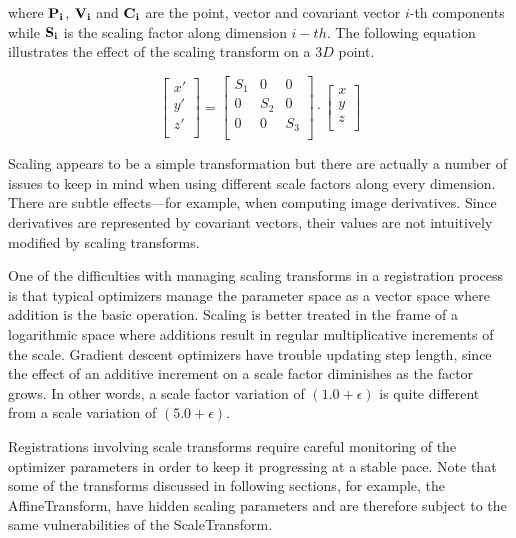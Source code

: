 where $\bf{P}_i$, $\bf{V}_i$ and $\bf{C}_i$ are the point, vector and covariant
vector $i$-th components while $\bf{S}_i$ is the scaling factor along dimension
$i-th$.  The following equation illustrates the effect of the scaling transform
on a $3D$ point.

\begin{equation}
\left[
\begin{array}{c}
x' \\
y' \\
z' \\
\end{array}
\right]
=
\left[
\begin{array}{ccc}
S_1 &  0  &  0  \\
 0  & S_2 &  0  \\
 0  &  0  & S_3 \\
\end{array}
\right]
\cdot
\left[
\begin{array}{c}
x  \\
y  \\
z  \\
\end{array}
\right]
\end{equation}

Scaling appears to be a simple transformation but there are actually a
number of issues to keep in mind when using different scale factors along
every dimension. There are subtle effects---for example, when computing image
derivatives. Since derivatives are represented by covariant vectors, their
values are not intuitively modified by scaling transforms.

One of the difficulties with managing scaling transforms in a registration
process is that typical optimizers manage the parameter space as a vector
space where addition is the basic operation. Scaling is better treated in the
frame of a logarithmic space where additions result in regular multiplicative
increments of the scale. Gradient descent optimizers have trouble updating
step length, since the effect of an additive increment on a scale factor
diminishes as the factor grows. In other words, a scale factor variation of
$(1.0+ \epsilon)$ is quite different from a scale variation of
$(5.0+\epsilon)$.

Registrations involving scale transforms require careful monitoring of the
optimizer parameters in order to keep it progressing at a stable pace. Note
that some of the transforms discussed in following sections, for example, the
AffineTransform, have hidden scaling parameters and are therefore
subject to the same vulnerabilities of the ScaleTransform.

